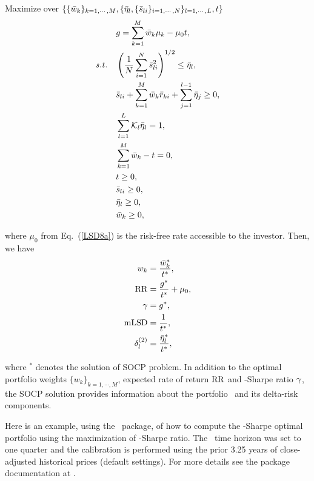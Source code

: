 \bigskip
\noindent Maximize over $\{ \{{\bar w}_k\}_{k=1,\cdots,M}, \{ {\bar \eta}_l, \{ {\bar s}_{li} \}_{i=1,\cdots,N} \}_{l=1,\cdots,L}, t \}$
\begin{subequations}\label{LSD8}
\begin{align}
    &  g = \sum_{k=1}^M \bw_k \mu_k - \mu_0 t, \label{LSD8a} \\
    \st & \left( \frac{1}{N} \sum_{i=1}^N \bs_{li}^2 \right)^{1/2} \leq \bbeta_l, \label{LSD8b} \\
        & \bs_{li} + \sum_{k=1}^M \bw_k\br_{ki} + \sum_{j=1}^{l-1}\bbeta_j \geq 0, \label{LSD8c} \\
        & \sum_{l=1}^L \cK_l \bbeta_l = 1, \label{LSD8d} \\
        & \sum_{k=1}^M \bw_k - t = 0, \label{LSD8e} \\
        & t \geq 0, \label{LSD8h} \\
        & \bs_{li} \geq 0, \label{LSD8f} \\
        & \bbeta_l \geq 0, \label{LSD8i} \\
        & \bw_k \geq 0, \label{LSD8g}
\end{align}
\end{subequations}

\noindent where $\mu_0$ from Eq.~(\ref{LSD8a}) is the risk-free rate accessible to the investor.
Then, we have
\begin{subequations}\label{LSD9}
\begin{align}
    w_k &= \frac{\bw_k^*}{t^*}, \label{LLSD9a} \\
    \RR &= \frac{g^*}{t^*} + \mu_0, \label{LSD9b} \\
    \Sharpe &= g^*, \label{LSD9c} \\
    \mLSD & = \frac{1}{t^*}, \label{LSD9d} \\
    \delta^{(2)}_l &= \frac{\bbeta_l^*}{t^*}, \label{LLSD9e}
\end{align}
\end{subequations}

\noindent where $^*$ denotes the solution of SOCP problem.
In addition to the optimal portfolio weights $\{w_k\}_{k=1,\cdots,M}$, expected rate of return ${\rm RR}$ and
\mLSD-Sharpe ratio ${\gamma}$,
the SOCP solution provides information about the portfolio \mLSD\ and its delta-risk components.

\bigskip
\noindent Here is an example, using the \azapy\ package, of how to compute the \mLSD-Sharpe optimal portfolio using the maximization
of \mLSD-Sharpe ratio.
The \mLSD\ time horizon was set to one quarter and the calibration is performed using the prior 3.25 years of
close-adjusted historical prices (default settings).
For more details see the package documentation at \azapydoc.

